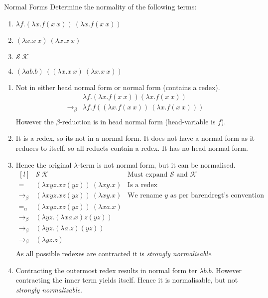 \begin{examplebox}{Normal Forms}
    Determine the normality of the following terms:
    \begin{enumerate}
        \item $\lambda f . (\lambda x . f(x \ x)) \ (\lambda x . f(x \ x))$
        \item $(\lambda x . x \ x) \ (\lambda x . x \ x)$
        \item $\mathcal{S} \ \mathcal{K}$
        \item $(\lambda a b . b) \ ((\lambda x . x \ x) \ (\lambda x . x \ x))$
    \end{enumerate}
    \tcblower
    \begin{enumerate}
        \item {Not in either head normal form or normal form (contains a redex).
            \[\begin{split}
                & \lambda f . (\lambda x . f (x \ x)) (\lambda x . f (x \ x)) \\
                \to_\beta & \lambda f . f ((\lambda x . f (x \ x)) \ (\lambda x . f (x \ x)))  \\
            \end{split}\]
            However the $\beta$-reduction is in head normal form (head-variable is $f$).
        }
        \item It is a redex, so its not in a normal form. It does not have a normal form as it reduces to itself, so all reducts contain a redex. It has no head-normal form.
        \item { Hence the original $\lambda$-term is not normal form, but it can be normalised. 
            \[\begin{matrix*}[l]
                & \mathcal{S} \ \mathcal{K} & \text{Must expand }\mathcal{S}\text{ and }\mathcal{K} \\
                = & (\lambda x y z . x z (y z)) \ (\lambda xy.x) & \text{Is a redex}\\
                \to_\beta & (\lambda x y z . x z (y z)) \ (\lambda xy.x) & \text{We rename $y$ as per barendregt's convention} \\
                =_\alpha & (\lambda x y z . x z (y z)) \ (\lambda xa.x) \\
                \to_\beta & (\lambda y z . (\lambda xa.x) z (y z)) \\
                \to_\beta & (\lambda y z . (\lambda a. z) (y z)) \\
                \to_\beta & (\lambda y z . z) \\
            \end{matrix*}\]
            As all possible redexes are contracted it is \textit{strongly normalisable}.
        }
        \item {
            Contracting the outermost redex results in normal form ter $\lambda b . b$. However contracting the inner term yields itself. Hence it is normalisable, but not \textit{strongly normalisable}.
        }
    \end{enumerate}
\end{examplebox}

